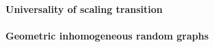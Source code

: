 
\paragraph{Universality of scaling transition}

\paragraph{Geometric inhomogeneous random graphs}

%


